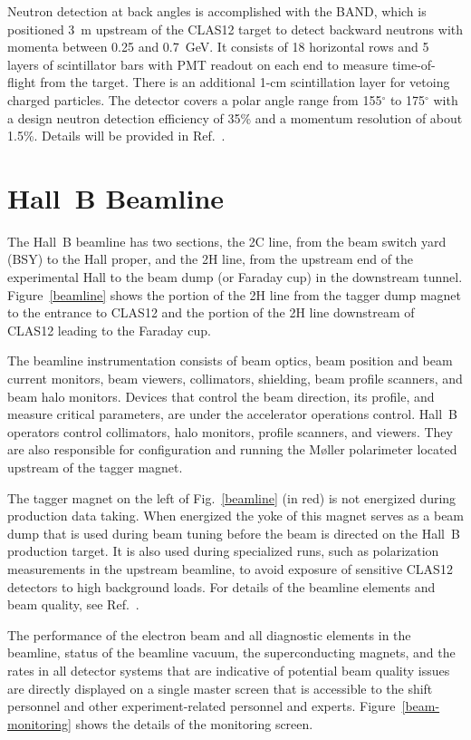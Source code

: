 \documentclass[final,3p,twocolumn]{elsarticle}
\begin{document}
Neutron detection at back angles is accomplished with the BAND, which is positioned 3~m upstream of the CLAS12
target to detect backward neutrons with momenta between 0.25 and 0.7~GeV. It consists of 18 horizontal rows and
5 layers of scintillator bars with PMT readout on each end to measure time-of-flight from the target. There is an
additional 1-cm scintillation layer for vetoing charged particles. The detector covers a polar angle range from
155$^\circ$ to 175$^\circ$ with a design neutron detection efficiency of 35\% and a momentum resolution of about
1.5\%. Details will be provided in Ref.~\cite{BAND}.

\section{Hall~B Beamline} 

The Hall~B beamline has two sections, the 2C line, from the beam switch yard (BSY) to the Hall proper, and the 2H
line, from the upstream end of the experimental Hall to the beam dump (or Faraday cup) in the downstream tunnel.
Figure~\ref{beamline} shows the portion of the 2H line from the tagger dump magnet to the entrance to CLAS12
and the portion of the 2H line downstream of CLAS12 leading to the Faraday cup.

The beamline instrumentation consists of beam optics, beam position and beam current monitors, beam viewers,
collimators, shielding, beam profile scanners, and beam halo monitors. Devices that control the beam direction, its
profile, and measure critical parameters, are under the accelerator operations control. Hall~B operators control
collimators, halo monitors, profile scanners, and viewers. They are also responsible for configuration and running the
M{\o}ller polarimeter located upstream of the tagger magnet.

The tagger magnet on the left of Fig.~\ref{beamline} (in red) is not energized during production data taking. When
energized the yoke of this magnet serves as a beam dump that is used during beam tuning before the beam is directed
on the Hall~B production target. It is also used during specialized runs, such as polarization measurements in the
upstream beamline, to avoid exposure of sensitive CLAS12 detectors to high background loads. For details of the
beamline elements and beam quality, see Ref.~\cite{beamline}.  

The performance of the electron beam and all diagnostic elements in the beamline, status of the beamline vacuum, 
the superconducting magnets, and the rates in all detector systems that are indicative of potential beam quality issues 
are directly displayed on a single master screen that is accessible to the shift personnel and other experiment-related 
personnel and experts. Figure~\ref{beam-monitoring} shows the details of the monitoring screen.     
\end{document}
